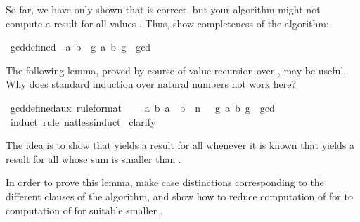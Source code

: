 \begin{isabellebody}
\begin{isamarkuptext}
So far, we have only shown that  is correct, but your
algorithm might not compute a result for all values . Thus, show completeness of the algorithm:%
\end{isamarkuptext}%
\isamarkuptrue%
\ gcd{\isacharunderscore}defined{\isacharcolon}\ {\isachardoublequote}{\isasymforall}\ a\ b{\isachardot}\ {\isasymexists}\ g{\isachardot}\ {\isacharparenleft}a{\isacharcomma}\ b{\isacharcomma}\ g{\isacharparenright}\ {\isasymin}\ gcd{\isachardoublequote}\isamarkupfalse%
\isamarkupfalse%
%
\begin{isamarkuptext}%
The following lemma, proved by course-of-value recursion over
, may be useful. Why does standard induction over natural
numbers not work here?%
\end{isamarkuptext}%
\isamarkuptrue%
\ gcd{\isacharunderscore}defined{\isacharunderscore}aux\ {\isacharbrackleft}rule{\isacharunderscore}format{\isacharbrackright}{\isacharcolon}\ \isanewline
\ \ {\isachardoublequote}{\isasymforall}\ a\ b{\isachardot}\ {\isacharparenleft}a\ {\isacharplus}\ b{\isacharparenright}\ {\isasymle}\ n\ {\isasymlongrightarrow}\ {\isacharparenleft}{\isasymexists}\ g{\isachardot}\ {\isacharparenleft}a{\isacharcomma}\ b{\isacharcomma}\ g{\isacharparenright}\ {\isasymin}\ gcd{\isacharparenright}{\isachardoublequote}\isanewline
\isamarkupfalse%
\ {\isacharparenleft}induct\ rule{\isacharcolon}\ nat{\isacharunderscore}less{\isacharunderscore}induct{\isacharparenright}\isanewline
\isamarkupfalse%
\ clarify\isanewline
\isamarkupfalse%
\isamarkupfalse%
%
\begin{isamarkuptext}%
The idea is to show that  yields a result for all
 whenever it is known that  yields a result
for all  whose sum is smaller than .

In order to prove this lemma, make case distinctions corresponding to
the different clauses of the algorithm, and show how to reduce
computation of  for  to computation of  for suitable smaller .%
\end{isamarkuptext}%
\isamarkuptrue%
\isanewline
\isamarkupfalse%
\end{isabellebody}%
